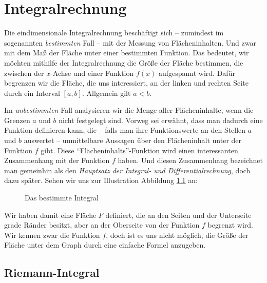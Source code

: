 
\chapter{Integralrechnung}

Die eindimensionale Integralrechnung beschäftigt sich -- zumindest im sogenannten \emph{bestimmten} Fall -- mit der Messung von Flächeninhalten. Und zwar mit dem Maß der Fläche unter einer bestimmten Funktion. Das bedeutet, wir möchten mithilfe der Integralrechnung die Größe der Fläche bestimmen, die zwischen der $x$-Achse und einer Funktion $f(x)$ aufgespannt wird. Dafür begrenzen wir die Fläche, die uns interessiert, an der linken und rechten Seite durch ein Interval $[a,b]$. Allgemein gilt $a<b$. 

Im \emph{unbestimmten} Fall analysieren wir die Menge aller Flächeninhalte, wenn die Grenzen $a$ und $b$ nicht festgelegt sind. Vorweg sei erwähnt, dass man dadurch eine Funktion definieren kann, die -- falls man ihre Funktionswerte an den Stellen $a$ und $b$ auswertet -- unmittelbare Aussagen über den Flächeninhalt unter der Funktion $f$ gibt. Diese "`Flächeninhalts"'-Funktion wird einen interessanten Zusammenhang mit der Funktion $f$ haben. Und diesen Zusammenhang bezeichnet man gemeinhin als den \emph{Hauptsatz der Integral- und Differentialrechnung}, doch dazu später.  Sehen wir uns zur Illustration Abbildung \ref{fig:int1} an:

\begin{figure}[h!]
\centering
{}
\caption{Das bestimmte Integral}
\label{fig:int1}
\end{figure}
Wir haben damit eine Fläche $F$ definiert, die an den Seiten und der Unterseite grade Ränder besitzt, aber an der Oberseite von der Funktion $f$ begrenzt wird. Wir kennen zwar die Funktion $f$, doch ist es uns nicht möglich, die Größe der Fläche unter dem Graph durch eine einfache Formel anzugeben. 

\section{Riemann-Integral}


